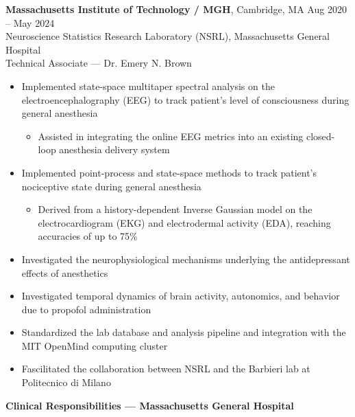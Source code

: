 \documentclass[11pt,letterpaper]{article}
\begin{document}
\vspace{6pt}

\textbf{Massachusetts Institute of Technology / MGH}, Cambridge, MA \hfill Aug 2020 -- May 2024\\
Neuroscience Statistics Research Laboratory (NSRL), Massachusetts General Hospital\\
Technical Associate — Dr. Emery N. Brown

\begin{itemize}
\item Implemented state-space multitaper spectral analysis on the electroencephalography (EEG) to track patient’s level of consciousness during general anesthesia
    \begin{itemize}
    \item Assisted in integrating the online EEG metrics into an existing closed-loop anesthesia delivery system
    \end{itemize}

\item Implemented point-process and state-space methods to track patient’s nociceptive state during general anesthesia
    \begin{itemize}
    \item Derived from a history-dependent Inverse Gaussian model on the electrocardiogram (EKG) and electrodermal activity (EDA), reaching accuracies of up to 75\%
    \end{itemize}

\item Investigated the neurophysiological mechanisms underlying the antidepressant effects of anesthetics
\item Investigated temporal dynamics of brain activity, autonomics, and behavior due to propofol administration
\item Standardized the lab database and analysis pipeline and integration with the MIT OpenMind computing cluster
\item Fascilitated the collaboration between NSRL and the Barbieri lab at Politecnico di Milano
\end{itemize}

\textbf{Clinical Responsibilities — Massachusetts General Hospital}
\end{document}
